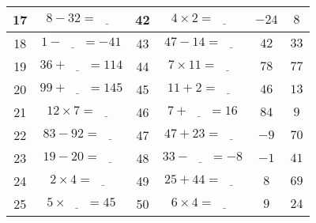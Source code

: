 \documentclass[french,a4paper,10pt]{article}
\begin{document}
\begin{tabular}{|c|c|c|c||c|c|}
\hline
17 & $8 - 32 = \underline{\phantom{999}}$ & 42 & $4 \times 2 = \underline{\phantom{999}}$ & $-24$ & $8$ \\
\hline
18 & $1 - \underline{\phantom{999}} = -41$ & 43 & $47 - 14 = \underline{\phantom{999}}$ & $42$ & $33$ \\
\hline
19 & $36 + \underline{\phantom{999}} = 114$ & 44 & $7 \times 11 = \underline{\phantom{999}}$ & $78$ & $77$ \\
\hline
20 & $99 + \underline{\phantom{999}} = 145$ & 45 & $11 + 2 = \underline{\phantom{999}}$ & $46$ & $13$ \\
\hline
21 & $12 \times 7 = \underline{\phantom{999}}$ & 46 & $7 + \underline{\phantom{999}} = 16$ & $84$ & $9$ \\
\hline
22 & $83 - 92 = \underline{\phantom{999}}$ & 47 & $47 + 23 = \underline{\phantom{999}}$ & $-9$ & $70$ \\
\hline
23 & $19 - 20 = \underline{\phantom{999}}$ & 48 & $33 - \underline{\phantom{999}} = -8$ & $-1$ & $41$ \\
\hline
24 & $2 \times 4 = \underline{\phantom{999}}$ & 49 & $25 + 44 = \underline{\phantom{999}}$ & $8$ & $69$ \\
\hline
25 & $5 \times \underline{\phantom{999}} = 45$ & 50 & $6 \times 4 = \underline{\phantom{999}}$ & $9$ & $24$ \\
\hline

\end{tabular}
\end{document}

